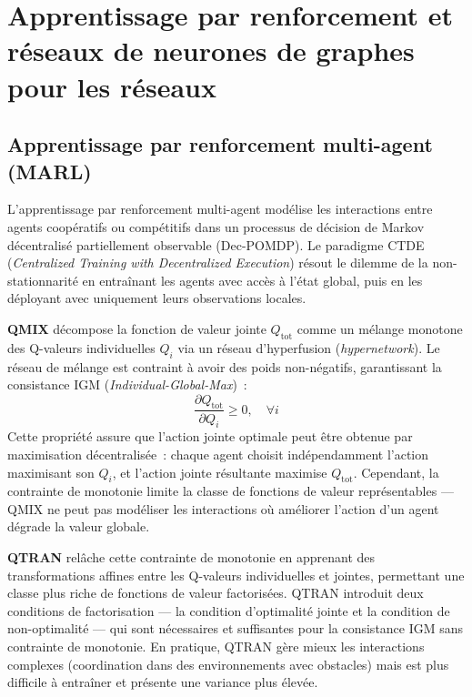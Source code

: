 \section{Apprentissage par renforcement et réseaux de neurones de graphes pour les réseaux}\label{sec:revlit-rl-gnn}

\subsection{Apprentissage par renforcement multi-agent (MARL)}

L'apprentissage par renforcement multi-agent modélise les interactions entre agents coopératifs ou compétitifs dans un processus de décision de Markov décentralisé partiellement observable (Dec-POMDP). Le paradigme CTDE (\emph{Centralized Training with Decentralized Execution}) résout le dilemme de la non-stationnarité en entraînant les agents avec accès à l'état global, puis en les déployant avec uniquement leurs observations locales.

\textbf{QMIX} \cite{rashid2018qmix} décompose la fonction de valeur jointe $Q_{\text{tot}}$ comme un mélange monotone des Q-valeurs individuelles $Q_i$ via un réseau d'hyperfusion (\emph{hypernetwork}). Le réseau de mélange est contraint à avoir des poids non-négatifs, garantissant la consistance IGM (\emph{Individual-Global-Max})~:
\begin{equation}
    \frac{\partial Q_{\text{tot}}}{\partial Q_i} \geq 0, \quad \forall i
\end{equation}
Cette propriété assure que l'action jointe optimale peut être obtenue par maximisation décentralisée~: chaque agent choisit indépendamment l'action maximisant son $Q_i$, et l'action jointe résultante maximise $Q_\text{tot}$. Cependant, la contrainte de monotonie limite la classe de fonctions de valeur représentables --- QMIX ne peut pas modéliser les interactions où améliorer l'action d'un agent dégrade la valeur globale.

\textbf{QTRAN} \cite{son2019qtran} relâche cette contrainte de monotonie en apprenant des transformations affines entre les Q-valeurs individuelles et jointes, permettant une classe plus riche de fonctions de valeur factorisées. QTRAN introduit deux conditions de factorisation --- la condition d'optimalité jointe et la condition de non-optimalité --- qui sont nécessaires et suffisantes pour la consistance IGM sans contrainte de monotonie. En pratique, QTRAN gère mieux les interactions complexes (coordination dans des environnements avec obstacles) mais est plus difficile à entraîner et présente une variance plus élevée.

